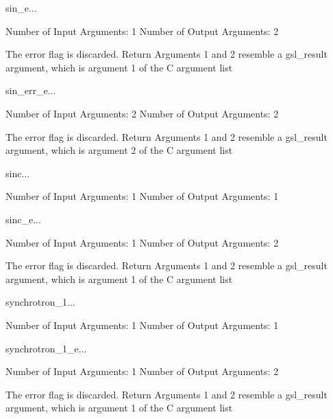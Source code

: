 \begin{funcdesc}{sin_e}{...}

    Number of Input  Arguments:  1
    Number of Output Arguments:  2

The error flag is discarded.
Return Arguments 1 and 2 resemble a gsl_result argument,
	which is  argument 1 of the C argument list

\end{funcdesc}

\begin{funcdesc}{sin_err_e}{...}

    Number of Input  Arguments:  2
    Number of Output Arguments:  2

The error flag is discarded.
Return Arguments 1 and 2 resemble a gsl_result argument,
	which is  argument 2 of the C argument list

\end{funcdesc}

\begin{funcdesc}{sinc}{...}

    Number of Input  Arguments:  1
    Number of Output Arguments:  1
\end{funcdesc}

\begin{funcdesc}{sinc_e}{...}

    Number of Input  Arguments:  1
    Number of Output Arguments:  2

The error flag is discarded.
Return Arguments 1 and 2 resemble a gsl_result argument,
	which is  argument 1 of the C argument list

\end{funcdesc}

\begin{funcdesc}{synchrotron_1}{...}

    Number of Input  Arguments:  1
    Number of Output Arguments:  1
\end{funcdesc}

\begin{funcdesc}{synchrotron_1_e}{...}

    Number of Input  Arguments:  1
    Number of Output Arguments:  2

The error flag is discarded.
Return Arguments 1 and 2 resemble a gsl_result argument,
	which is  argument 1 of the C argument list

\end{funcdesc}

